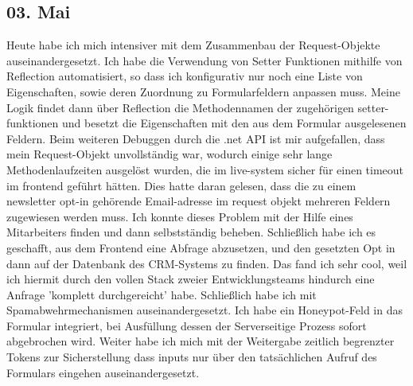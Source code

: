 \subsection{03. Mai}
Heute habe ich mich intensiver mit dem Zusammenbau der Request-Objekte auseinandergesetzt. Ich habe die Verwendung von Setter Funktionen mithilfe von Reflection automatisiert, so dass ich konfigurativ nur noch eine Liste von Eigenschaften, sowie deren Zuordnung zu Formularfeldern anpassen muss. Meine Logik findet dann über Reflection die Methodennamen der zugehörigen setter-funktionen und besetzt die Eigenschaften mit den aus dem Formular ausgelesenen Feldern. 
Beim weiteren Debuggen durch die .net API ist mir aufgefallen, dass mein Request-Objekt unvollständig war, wodurch einige sehr lange Methodenlaufzeiten ausgelöst wurden, die im live-system sicher für einen timeout im frontend geführt hätten. Dies hatte daran gelesen, dass die zu einem newsletter opt-in gehörende Email-adresse im request objekt mehreren Feldern zugewiesen werden muss. Ich konnte dieses Problem mit der Hilfe eines Mitarbeiters finden und dann selbstständig beheben. Schließlich habe ich es geschafft, aus dem Frontend eine Abfrage abzusetzen, und den gesetzten Opt in dann auf der Datenbank des CRM-Systems zu finden. Das fand ich sehr cool, weil ich hiermit durch den vollen Stack zweier Entwicklungsteams hindurch eine Anfrage 'komplett durchgereicht' habe.
Schließlich habe ich mit Spamabwehrmechanismen auseinandergesetzt. Ich habe ein Honeypot-Feld in das Formular integriert, bei Ausfüllung dessen der Serverseitige Prozess sofort abgebrochen wird. Weiter habe ich mich mit der Weitergabe zeitlich begrenzter Tokens zur Sicherstellung dass inputs nur über den tatsächlichen Aufruf des Formulars eingehen auseinandergesetzt.